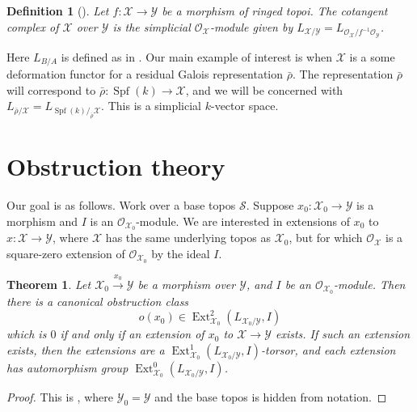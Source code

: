 \documentclass{article}
\DeclareMathOperator{\ext}{Ext}
\DeclareMathOperator{\spf}{Spf}
\newcommand{\cS}{\mathcal{S}}
\newcommand{\cX}{\mathcal{X}}
\newcommand{\cY}{\mathcal{Y}}
\newcommand{\sO}{\mathscr{O}}
\newtheorem{definition}[subsection]{Definition}
\newtheorem{theorem}[subsection]{Theorem}
\begin{document}
\begin{definition}[{\cite[II 1.2.7]{illusie-1971}}]
Let $f:\cX\to \cY$ be a morphism of ringed topoi. The \emph{cotangent complex} 
of $\cX$ over $\cY$ is the simplicial $\sO_\cX$-module given by 
$L_{\cX/\cY} = L_{\sO_\cX/f^{-1} \sO_\cY}$. 
\end{definition}

Here $L_{B/A}$ is defined as in \cite[II 1.2]{illusie-1971}. Our main example 
of interest is when $\cX$ is a some deformation functor for a residual Galois 
representation $\bar\rho$. The representation $\bar\rho$ will correspond to 
$\bar\rho:\spf(k)\to\cX$, and we will be concerned with 
$L_{\bar\rho/\cX} = L_{\spf(k)/_{\bar\rho}\cX}$. This is a simplicial 
$k$-vector space. 





\section{Obstruction theory}

Our goal is as follows. Work over a base topos $\cS$. Suppose 
$x_0:\cX_0\to \cY$ is a morphism and $I$ is an $\sO_{\cX_0}$-module. We are 
interested in extensions of $x_0$ to $x:\cX\to \cY$, where $\cX$ has the same 
underlying topos as $\cX_0$, but for which $\sO_\cX$ is a square-zero extension 
of $\sO_{\cX_0}$ by the ideal $I$. 

\begin{theorem}
Let $\cX_0\xrightarrow{x_0}\cY$ be a morphism over $\cY$, and $I$ be an 
$\sO_{\cX_0}$-module. Then there is a canonical \emph{obstruction class} 
\[
  o(x_0)\in \ext_{\cX_0}^2(L_{\cX_0/\cY},I) 
\]
which is $0$ if and only if an extension of $x_0$ to $\cX\to \cY$ exists. If 
such an extension exists, then the extensions are a 
$\ext_{\cX_0}^1(L_{\cX_0/\cY},I)$-torsor, and each extension has automorphism 
group $\ext_{\cX_0}^0(L_{\cX_0/\cY},I)$. 
\end{theorem}
\begin{proof}
This is \cite[III 2.1.7]{illusie-1971}, where $\cY_0=\cY$ and the base topos is 
hidden from notation.  
\end{proof}







\end{document}
